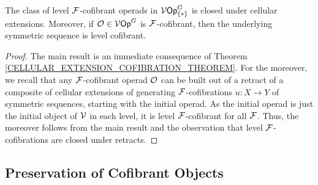 \documentclass[a4paper,10pt]{article}%
\begin{document}
\begin{corollary}
  \label{SIGMA_COFIBRANT_THEOREM}
  The class of level $\mathcal F$-cofibrant operads in $\mathcal V\mathsf{Op}^G_{\left\{*\right\}}$ is closed under cellular extensions.
  Moreover, if $\mathcal{O} \in \mathcal V\mathsf{Op}^G$ is $\mathcal F$-cofibrant, then the underlying symmetric sequence is level cofibrant.
\end{corollary}
\begin{proof}
  The main result is an immediate consequence of Theorem \ref{CELLULAR_EXTENSION_COFIBRATION_THEOREM}. For the moreover, we recall that any $\mathcal F$-cofibrant operad $\mathcal{O}$ can be built out of a retract of a composite of cellular extensions of generating $\mathcal F$-cofibrations $u: X\to Y$ of symmetric sequences, starting with the initial operad. As the initial operad is just the initial object of $\mathcal V$ in each level, it is level $\mathcal F$-cofibrant for all $\mathcal F$. Thus, the moreover follows from the main result and the observation that level $\mathcal F$-cofibrations are closed under retracts.
\end{proof}


\subsection{Preservation of Cofibrant Objects}




\end{document}
